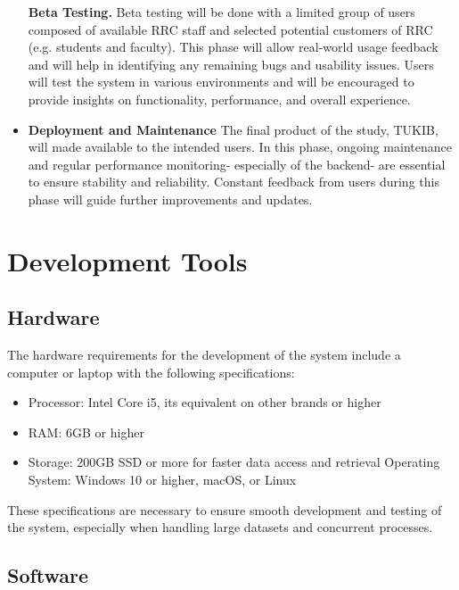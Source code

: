 \begin{itemize}
	\subitem \textbf{Beta Testing.}  Beta testing will be done with a limited group of users composed of available RRC staff and selected potential customers of RRC (e.g. students and faculty). This phase will allow real-world usage feedback and will help in identifying any remaining bugs and usability issues. Users will test the system in various environments and will be encouraged to provide insights on functionality, performance, and overall experience. \newline
	
	\item \textbf{Deployment and Maintenance}
	\subitem The final product of the study, TUKIB, will made available to the intended users. In this phase, ongoing maintenance and regular performance monitoring- especially of the backend- are essential to ensure stability and reliability. Constant feedback from users during this phase will guide further improvements and updates.
	
\end{itemize}

\section{Development Tools}

\subsection{Hardware}

The hardware requirements for the development of the system include a computer or laptop with the following specifications:

\begin{itemize}
	\item Processor: Intel Core i5, its equivalent on other brands or higher
	\item RAM: 6GB or higher
	\item Storage: 200GB SSD or more for faster data access and retrieval
	Operating System: Windows 10 or higher, macOS, or Linux
\end{itemize}

These specifications are necessary to ensure smooth development and testing of the system, especially when handling large datasets and concurrent processes.

\subsection{Software}

